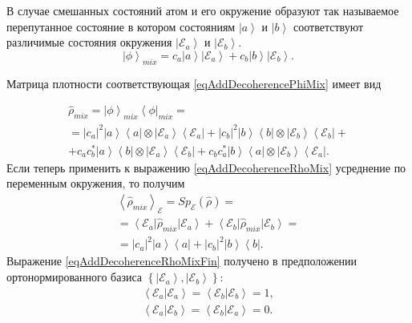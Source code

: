 В случае смешанных состояний атом и его окружение образуют так
называемое перепутанное состояние в котором состояниям
$\left|a\right>$ и $\left|b\right>$ соответствуют различимые 
состояния окружения $\left|\mathcal{E}_a\right>$ и
$\left|\mathcal{E}_b\right>$.
\begin{equation}
\left|\phi\right>_{mix} = c_a\left|a\right> \left|\mathcal{E}_a\right>
+ c_b\left|b\right> \left|\mathcal{E}_b\right>.
\label{eqAddDecoherencePhiMix}
\end{equation}

Матрица плотности 
соответствующая \eqref{eqAddDecoherencePhiMix} имеет вид

\begin{eqnarray}
\hat{\rho}_{mix} = \left|\phi\right>_{mix}\left<\phi\right|_{mix} = 
\nonumber \\
= 
\left|c_a\right|^2 \left|a\right>\left<a\right| \otimes
\left|\mathcal{E}_a\right>\left<\mathcal{E}_a\right| + 
\left|c_b\right|^2 \left|b\right>\left<b\right| \otimes
\left|\mathcal{E}_b\right>\left<\mathcal{E}_b\right| +
\nonumber \\
+
c_a c_b^{\ast}\left|a\right>\left<b\right| \otimes
\left|\mathcal{E}_a\right>\left<\mathcal{E}_b\right| +
c_b c_a^{\ast}\left|b\right>\left<a\right| \otimes
\left|\mathcal{E}_b\right>\left<\mathcal{E}_a\right|.
\label{eqAddDecoherenceRhoMix}
\end{eqnarray}
Если теперь применить к выражению \eqref{eqAddDecoherenceRhoMix}
усреднение по переменным окружения, то получим
\begin{eqnarray}
\left<\hat{\rho}_{mix}\right>_{\mathcal{E}} = 
Sp_{\mathcal{E}}\left(\hat{\rho}\right) = 
\nonumber \\
=
\left<\mathcal{E}_a\right|\hat{\rho}_{mix}\left|\mathcal{E}_a\right> +
\left<\mathcal{E}_b\right|\hat{\rho}_{mix}\left|\mathcal{E}_b\right>
= 
\nonumber \\
= \left|c_a\right|^2 \left|a\right>\left<a\right| + 
\left|c_b\right|^2 \left|b\right>\left<b\right|.
\label{eqAddDecoherenceRhoMixFin}
\end{eqnarray}
Выражение  \eqref{eqAddDecoherenceRhoMixFin} получено в предположении
ортонормированного базиса $\left\{\left|\mathcal{E}_a\right>,
\left|\mathcal{E}_b\right>\right\}$: 
\begin{eqnarray}
\left<\mathcal{E}_a\right.\left|\mathcal{E}_a\right> = 
\left<\mathcal{E}_b\right.\left|\mathcal{E}_b\right> = 1,
\nonumber \\
\left<\mathcal{E}_a\right.\left|\mathcal{E}_b\right> = 
\left<\mathcal{E}_b\right.\left|\mathcal{E}_a\right> = 0.
\label{eqAddDecoherenceMixECond}
\end{eqnarray}

